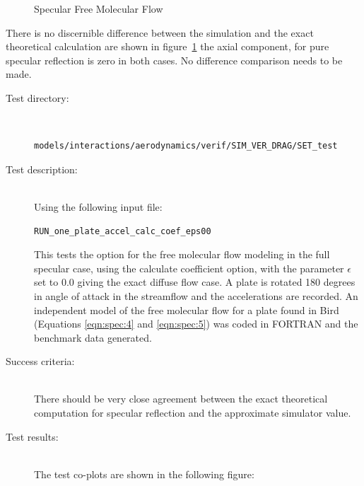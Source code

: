 \begin{description}
\begin{figure}[hbpt]
\caption{Specular Free Molecular Flow}
\label{fig:5}
\end{figure}
There is no discernible difference between the simulation and the exact
theoretical calculation are shown in figure~\ref{fig:5} the axial
component, for pure specular reflection  is zero in both cases.  No difference
comparison needs to be made.
\end{description}

\label{test:mfd}
\begin{description}
\item[Test directory:] \
\begin{verbatim}models/interactions/aerodynamics/verif/SIM_VER_DRAG/SET_test\end{verbatim}
\item[Test description:] \ \\
Using the following input file:
\begin{verbatim}RUN_one_plate_accel_calc_coef_eps00\end{verbatim}
This tests the option for the free molecular flow
modeling in the full specular case, using the calculate coefficient option,
with the parameter $\epsilon$ set to 0.0 giving the exact diffuse flow
case. A plate is rotated 180 degrees in angle of attack in the
streamflow and the accelerations are recorded. An independent model
of the free molecular flow for a plate found in Bird~\cite{Bird} (Equations
\ref{eqn:spec:4} and \ref{eqn:spec:5})
was coded in FORTRAN and the benchmark data generated.
\item[Success criteria:] \ \\
There should be very close agreement between the exact theoretical
computation for specular reflection and the approximate simulator
value.
\item[Test results:] \ \\
The test co-plots are shown in the following figure:
\begin{figure}[hbpt]

\end{figure}
\end{description}
